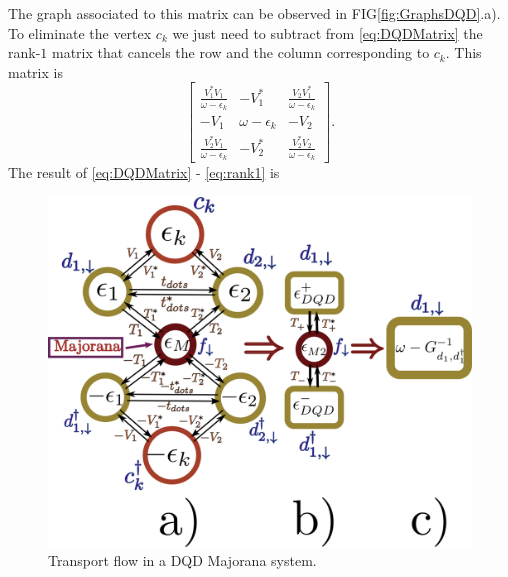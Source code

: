 \documentclass[showpacs,aps,prb,reprint,superscriptaddress]{revtex4-1}
\begin{document}
\noindent The graph associated to this matrix can be observed in FIG\ref{fig:GraphsDQD}.a). To eliminate the vertex $c_k$ we just need to subtract from \eqref{eq:DQDMatrix} the rank-$1$ matrix that cancels the row and the column corresponding to $c_k$. This matrix is 
\begin{equation}
        \left[\begin{array}{ccc}
    \frac{V_{1}^{*}V_{1}}{\omega-\epsilon_{k}} & -V_{1}^{*} & \frac{V_{2}V_{1}^{*}}{\omega-\epsilon_{k}}\\
    -V_{1} & \omega-\epsilon_{k} & -V_{2}\\
    \frac{V_{2}^{*}V_{1}}{\omega-\epsilon_{k}} & -V_{2}^{*} & \frac{V_{2}^{*}V_{2}}{\omega-\epsilon_{k}}
    \end{array}\right]. \label{eq:rank1}
\end{equation}
The result of \eqref{eq:DQDMatrix} -  \eqref{eq:rank1} is 




    \begin{figure}[t]
    \begin{center}
    \centering
     \includegraphics[scale=0.29]{Graficos/Graphs-DQD-M-Pro.png}
    \caption{ Transport flow in a DQD Majorana system.   \label{fig:Transport}
    }
    
    \end{center}
    \end{figure}
\end{document}
